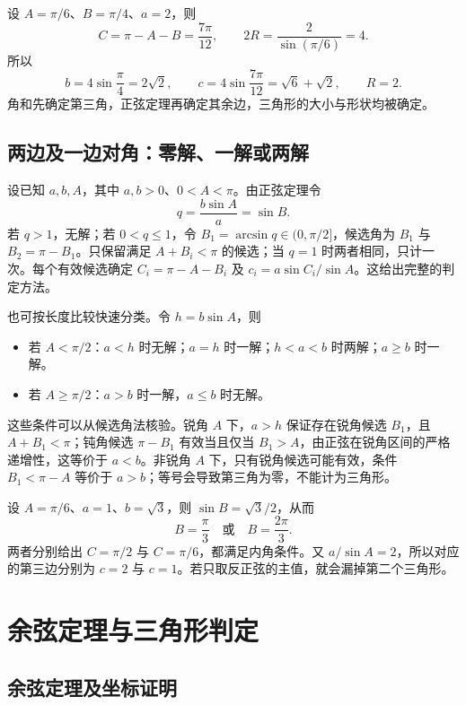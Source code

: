 \documentclass[UTF8]{ctexart}
\begin{document}
\begin{example}[已知两角和一边]
设 $A=\pi/6$、$B=\pi/4$、$a=2$，则
\[
  C=\pi-A-B=\frac{7\pi}{12},\qquad
  2R=\frac2{\sin(\pi/6)}=4.
\]
所以
\[
  b=4\sin\frac\pi4=2\sqrt2,\qquad
  c=4\sin\frac{7\pi}{12}=\sqrt6+\sqrt2,\qquad R=2.
\]
角和先确定第三角，正弦定理再确定其余边，三角形的大小与形状均被确定。
\end{example}

\subsection{两边及一边对角：零解、一解或两解}
\label{subsec:trig-ssa}

设已知 $a,b,A$，其中 $a,b>0$、$0<A<\pi$。由正弦定理令
\[
  q=\frac{b\sin A}{a}=\sin B.
\]
若 $q>1$，无解；若 $0<q\le1$，令 $B_1=\arcsin q\in(0,\pi/2]$，候选角为 $B_1$ 与 $B_2=\pi-B_1$。只保留满足 $A+B_i<\pi$ 的候选；当 $q=1$ 时两者相同，只计一次。每个有效候选确定 $C_i=\pi-A-B_i$ 及 $c_i=a\sin C_i/\sin A$。这给出完整的判定方法。

也可按长度比较快速分类。令 $h=b\sin A$，则
\begin{itemize}
  \item 若 $A<\pi/2$：$a<h$ 时无解；$a=h$ 时一解；$h<a<b$ 时两解；$a\ge b$ 时一解。
  \item 若 $A\ge\pi/2$：$a>b$ 时一解，$a\le b$ 时无解。
\end{itemize}
这些条件可以从候选角法核验。锐角 $A$ 下，$a>h$ 保证存在锐角候选 $B_1$，且 $A+B_1<\pi$；钝角候选 $\pi-B_1$ 有效当且仅当 $B_1>A$，由正弦在锐角区间的严格递增性，这等价于 $a<b$。非锐角 $A$ 下，只有锐角候选可能有效，条件 $B_1<\pi-A$ 等价于 $a>b$；等号会导致第三角为零，不能计为三角形。

\begin{example}[出现两个三角形]
设 $A=\pi/6$、$a=1$、$b=\sqrt3$，则 $\sin B=\sqrt3/2$，从而
\[
  B=\frac\pi3\quad\text{或}\quad B=\frac{2\pi}3.
\]
两者分别给出 $C=\pi/2$ 与 $C=\pi/6$，都满足内角条件。又 $a/\sin A=2$，所以对应的第三边分别为 $c=2$ 与 $c=1$。若只取反正弦的主值，就会漏掉第二个三角形。
\end{example}

\section{余弦定理与三角形判定}
\label{sec:trig-cosine-law}

\subsection{余弦定理及坐标证明}
\end{document}
